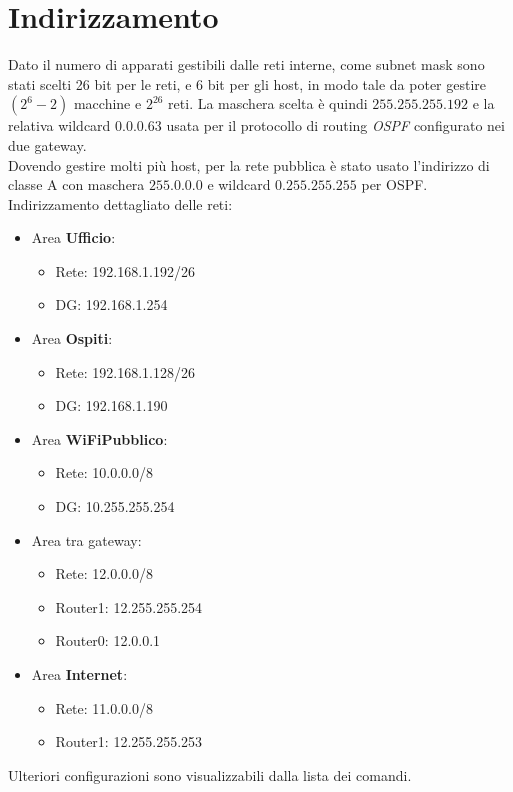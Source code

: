 \documentclass[a4paper]{article}
\begin{document}
	\section{Indirizzamento}
	Dato il numero di apparati gestibili dalle reti interne, come subnet mask sono stati scelti 26 bit per le reti, e 6 bit per gli host, in modo tale da poter gestire $(2^{6} - 2)$ macchine e $2^{26}$ reti. La maschera scelta è quindi $255.255.255.192$ e la relativa wildcard $0.0.0.63$ usata per il protocollo di routing \textit{OSPF} configurato nei due gateway.\\
	Dovendo gestire molti più host, per la rete pubblica è stato usato l'indirizzo di classe A con maschera $255.0.0.0$ e wildcard $0.255.255.255$ per OSPF.\\
	Indirizzamento dettagliato delle reti:
	\begin{itemize}
		\item Area \textbf{Ufficio}:
		\begin{itemize}
			\item Rete: 192.168.1.192/26
			\item DG: 192.168.1.254
		\end{itemize}
		\item Area \textbf{Ospiti}:
		\begin{itemize}
			\item Rete: 192.168.1.128/26
			\item DG: 192.168.1.190
		\end{itemize}
		\item Area \textbf{WiFiPubblico}:
		\begin{itemize}
			\item Rete: 10.0.0.0/8
			\item DG: 10.255.255.254
		\end{itemize}
		\item Area tra gateway:
		\begin{itemize}
			\item Rete: 12.0.0.0/8
			\item Router1: 12.255.255.254
			\item Router0: 12.0.0.1
		\end{itemize}
		\item Area \textbf{Internet}:
		\begin{itemize}
			\item Rete: 11.0.0.0/8
			\item Router1: 12.255.255.253
		\end{itemize}
	\end{itemize}
	Ulteriori configurazioni sono visualizzabili dalla lista dei comandi.
\end{document}
